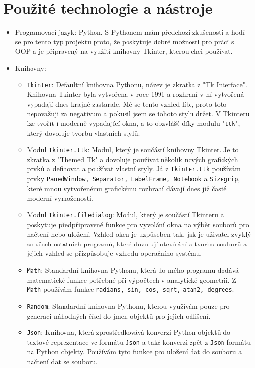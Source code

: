 \documentclass[12pt,a4paper]{report}
\begin{document}
\section{Použité technologie a nástroje}
\begin{itemize}
    \item Programovací jazyk: Python. S Pythonem mám předchozí zkušenosti a hodí se pro tento typ projektu proto, že poskytuje dobré možnosti pro práci s OOP a je připravený na využití knihovny Tkinter, kterou chci používat.
    \item Knihovny:
    \begin{itemize}
        \item \lstinline{Tkinter}: Defaultní knihovna Pythonu, název je zkratka z "Tk Interface".
    Knihovna Tkinter byla vytvořena v roce 1991 a rozhraní v ní vytvořená vypadají dnes krajně zastarale. Mě se tento vzhled líbí, proto toto nepovažuji za negativum a pokusil jsem se tohoto stylu držet. V Tkinteru lze tvořit i moderně vypadající okna, a to obzvlášť díky modulu "\lstinline{ttk}", který dovoluje tvorbu vlastních stylů.
    \item Modul \lstinline{Tkinter.ttk}: Modul, který je součástí knihovny Tkinter. Je to zkratka z "Themed Tk" a dovoluje používat několik nových grafických prvků a definovat a používat vlastní styly. Já z \lstinline{Tkinter.ttk} používám prvky \lstinline{PanedWindow, Separator, LabelFrame, Notebook} a \lstinline{Sizegrip}, které mnou vytvořenému grafickému rozhraní dávají dnes již časté moderní vymoženosti.
    \item Modul \lstinline{Tkinter.filedialog}: Modul, který je součástí Tkinteru a poskytuje předpřipravené funkce pro vyvolání okna na výběr souborů pro načtení nebo uložení. Vzhled oken je uzpůsoben tak, jak je uživatel zvyklý ze všech ostatních programů, které dovolují otevírání a tvorbu souborů a jejich vzhled se přizpůsobuje vzhledu operačního systému.
    \item \lstinline{Math}: Standardní knihovna Pythonu, která do mého programu dodává matematické funkce potřebné při výpočtech v analytické geometrii. Z \lstinline{Math} používám funkce \lstinline{radians, sin, cos, sqrt,} \newline\lstinline{atan2, degrees}.
    \item \lstinline{Random}: Standardní knihovna Pythonu, kterou využívám pouze pro generaci náhodných čísel do jmen objektů pro jejich odlišení.
    \item \lstinline{Json}: Knihovna, která zprostředkovává konverzi Python objektů do textové reprezentace ve formátu \lstinline{Json} a také konverzi zpět z \lstinline{Json} formátu na Python objekty. Používám tyto funkce pro uložení dat do souboru a načtení dat ze souboru.

\end{itemize}
\end{itemize}
\end{document}

